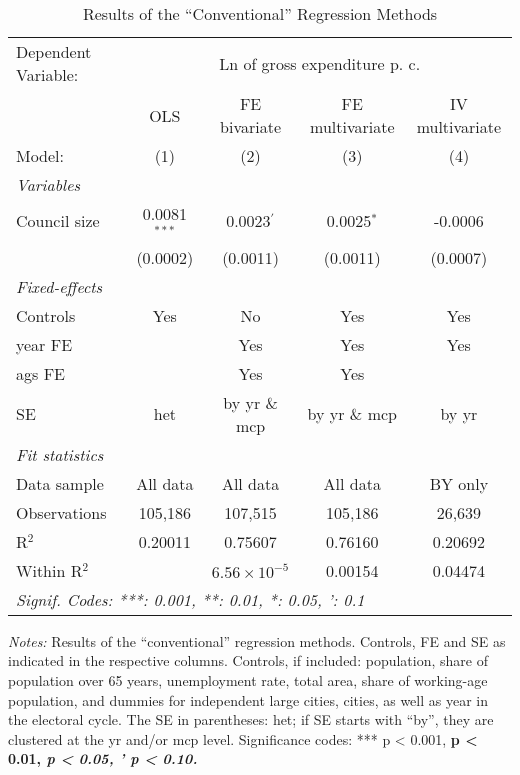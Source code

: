 
\begin{table}[htbp]
   \caption{\label{tab:conv_results} Results of the ``Conventional'' Regression Methods}
   \centering
   \begin{tabular}{lcccc}
      \tabularnewline \midrule \midrule
      Dependent Variable: & \multicolumn{4}{c}{Ln of gross expenditure p. c.}\\
                    & \acs{OLS}      & \acs{FE} bivariate    & \acs{FE} multivariate  & \acs{IV} multivariate \\    
      Model:        & (1)            & (2)                   & (3)                    & (4)\\  
      \midrule
      \emph{Variables}\\
      Council size  & 0.0081$^{***}$ & 0.0023$^{'}$          & 0.0025$^{*}$           & -0.0006\\   
                    & (0.0002)       & (0.0011)              & (0.0011)               & (0.0007)\\   
      \midrule
      \emph{Fixed-effects}\\
      Controls      & Yes            & No                    & Yes                    & Yes\\  
      year \ac{FE}  &                & Yes                   & Yes                    & Yes\\  
      ags \ac{FE}   &                & Yes                   & Yes                    & \\  
      \acs{SE} & \acs{het} & by \acs{yr} \& \acs{mcp} & by \acs{yr} \& \acs{mcp} & by \acs{yr}\\
      \midrule
      \emph{Fit statistics}\\
      Data sample   & All data       & All data              & All data               & \acs{BY} only\\   
      Observations  & 105,186        & 107,515               & 105,186                & 26,639\\  
      R$^2$         & 0.20011        & 0.75607               & 0.76160                & 0.20692\\  
      Within R$^2$  &                & $6.56\times 10^{-5}$  & 0.00154                & 0.04474\\  
      \midrule \midrule
      \multicolumn{5}{l}{\emph{Signif. Codes: ***: 0.001, **: 0.01, *: 0.05, ': 0.1}}\\
   \end{tabular}
   
   \par \raggedright 
   \footnotesize{\textit{Notes:} Results of the ``conventional'' regression methods. Controls, \ac{FE} and \ac{SE} as indicated in the respective columns. Controls, if included: population, share of population over 65 years, unemployment rate, total area, share of working-age population, and dummies for independent large cities, cities, as well as year in the electoral cycle. The \acl{SE} in parentheses: \ac{het}; if \ac{SE} starts with ``by'', they are clustered at the \ac{yr} and/or \ac{mcp} level. Significance codes: *** p < 0.001, \textbf{ p < 0.01, \textit{ p < 0.05, ' p < 0.10.}}}
\end{table}


